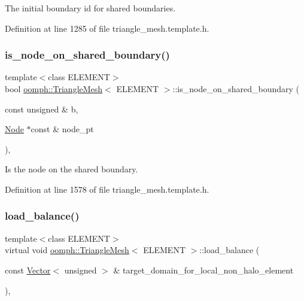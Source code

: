 The initial boundary id for shared boundaries. 



Definition at line 1285 of file triangle\+\_\+mesh.\+template.\+h.

\mbox{\label{classoomph_1_1TriangleMesh_a14bf5a67e8ce6cc64a38922b08af991c}} 
\subsubsection{\texorpdfstring{is\+\_\+node\+\_\+on\+\_\+shared\+\_\+boundary()}{is\_node\_on\_shared\_boundary()}}
{\footnotesize\ttfamily template$<$class E\+L\+E\+M\+E\+NT$>$ \\
bool \hyperlink{classoomph_1_1TriangleMesh}{oomph\+::\+Triangle\+Mesh}$<$ E\+L\+E\+M\+E\+NT $>$\+::is\+\_\+node\+\_\+on\+\_\+shared\+\_\+boundary (\begin{DoxyParamCaption}\item[{const unsigned \&}]{b,  }\item[{\hyperlink{classoomph_1_1Node}{Node} $\ast$const \&}]{node\+\_\+pt }\end{DoxyParamCaption})\hspace{0.3cm}{\ttfamily [inline]}, {\ttfamily [protected]}}



Is the node on the shared boundary. 



Definition at line 1578 of file triangle\+\_\+mesh.\+template.\+h.

\mbox{\label{classoomph_1_1TriangleMesh_a712bfd68d4b55e9c475347c0146fc8ac}} 
\subsubsection{\texorpdfstring{load\+\_\+balance()}{load\_balance()}}
{\footnotesize\ttfamily template$<$class E\+L\+E\+M\+E\+NT$>$ \\
virtual void \hyperlink{classoomph_1_1TriangleMesh}{oomph\+::\+Triangle\+Mesh}$<$ E\+L\+E\+M\+E\+NT $>$\+::load\+\_\+balance (\begin{DoxyParamCaption}\item[{const \hyperlink{classoomph_1_1Vector}{Vector}$<$ unsigned $>$ \&}]{target\+\_\+domain\+\_\+for\+\_\+local\+\_\+non\+\_\+halo\+\_\+element }\end{DoxyParamCaption})\hspace{0.3cm}{\ttfamily [inline]}, {\ttfamily [virtual]}}



